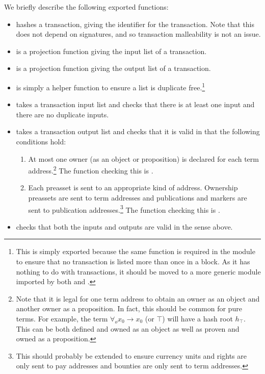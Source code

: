 We briefly describe the following exported functions:
\begin{itemize}
\item {} hashes a transaction, giving the identifier for the transaction.
Note that this does not depend on signatures, and so transaction malleability is not an issue.
\item {} is a projection function giving the input list of a transaction.
\item {} is a projection function giving the output list of a transaction.
\item {} is simply a helper function to ensure a list is duplicate free.\footnote{This is simply exported because the same function is required in the {} module to ensure that no transaction is listed more than once in a block. As it has nothing to do with transactions, it should be moved to a more generic module imported by both {} and {}.}
\item {} takes a transaction input list
and checks that there is at least one input and there are no duplicate inputs.
\item {} takes a transaction output list
and checks that it is valid in that the following conditions hold:
\begin{enumerate}
\item At most one owner (as an object or proposition) is declared for each term address.\footnote{Note that it is legal for one term address to obtain an owner as an object and another owner as a proposition. In fact, this should be common for pure terms. For example, the term $\forall_o x_0\to x_0$ (or $\top$) will have
a hash root $h_\top$. This can be both defined and owned as an object as well as proven and owned as a proposition.}
The function checking this is {}.
\item Each preasset is sent to an appropriate kind of address.
Ownership preassets are sent to term addresses
and publications and markers are sent to publication addresses.\footnote{This should probably be extended to ensure currency units and rights are only sent to pay addresses and bounties are only sent to term addresses.}
The function checking this is {}.
\end{enumerate}
\item {} checks that both the inputs and outputs are valid in the sense above.

\end{itemize}
